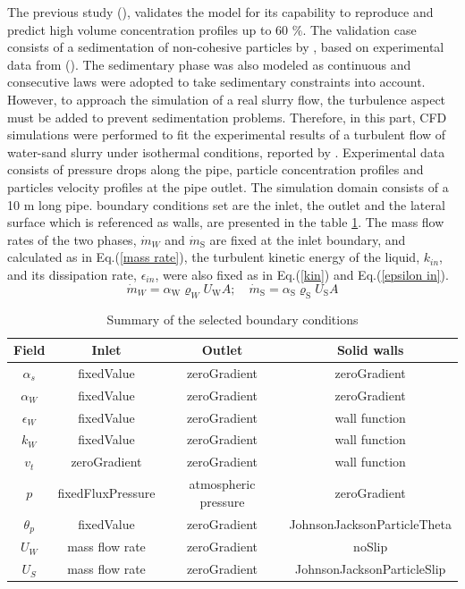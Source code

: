 \documentclass[11pt]{report}
\begin{document}
%
The previous study (\citet{elkarii2020towards}), validates the model for its capability to reproduce and predict high volume concentration profiles up to 60 $\%$. 
%
The validation case consists of a sedimentation of non-cohesive particles by \citet{chauchat}, based on experimental data from (\citet{Pha-2008}). 
%
The sedimentary phase was also modeled as continuous and consecutive laws were adopted to take sedimentary constraints into account.
%
 However, to approach the simulation of a real slurry flow, the turbulence aspect must be added to prevent sedimentation problems. 
 Therefore, in this part, CFD simulations were performed to fit the experimental results of a turbulent flow of water-sand slurry under isothermal conditions, reported by \citet{Randal-2004}. 
 Experimental data consists of pressure drops along the pipe, particle concentration profiles and particles velocity profiles at the pipe outlet. 
 The simulation domain consists of a 10 m long pipe. boundary conditions set are the inlet, the outlet and the lateral surface which is referenced as walls, are presented in the table \ref{tab:bc}. 
 The mass flow rates of the two phases, \(\dot{m}_{W}\) and \(\dot{m}_{\mathrm{S}}\) are fixed at the inlet boundary, and calculated as in Eq.(\ref{mass rate}), the turbulent kinetic energy of the liquid, \(k_{in}\), 
 and its dissipation rate, \(\epsilon_{in }\), were also fixed as in Eq.(\ref{kin}) and Eq.(\ref{epsilon in}). 
\begin{equation}
 \dot{m}_{W}= \alpha_{\mathrm{W}} \varrho_{W} U_{\mathrm{W}} A;\quad \dot{m}_{\mathrm{S}}= \alpha_{\mathrm{S}} \varrho_{\mathrm{S}} U_{\mathrm{S}} A
 \label{mass rate}
 \end{equation}
%
 \begin{table}[ht!]
 \begin{center}
 \caption{Summary of the selected boundary conditions}
 \label{tab:bc}
 \begin{tabular}{cccc}
 \hline Field & Inlet & Outlet & Solid walls  \\
 \hline\(\alpha_{s}\) & fixedValue & zeroGradient & zeroGradient \\
 \(\alpha_{W}\) & fixedValue & zeroGradient & zeroGradient \\
 \(\epsilon_{W}\) & fixedValue & zeroGradient & wall function\\
 \(k_{W}\) & fixedValue & zeroGradient & wall function \\
 \(v_{t}\) & zeroGradient & zeroGradient &  wall function \\
 \(p\) & fixedFluxPressure & atmospheric pressure & zeroGradient \\
 \(\theta_{p}\) & fixedValue & zeroGradient & JohnsonJacksonParticleTheta\\
 \(U_{W}\) & mass flow rate  & zeroGradient & noSlip\\
 \(U_{S}\) & mass flow rate  & zeroGradient & JohnsonJacksonParticleSlip  \\
 \hline
 \end{tabular}
 \end{center}
 \end{table}
\end{document}
